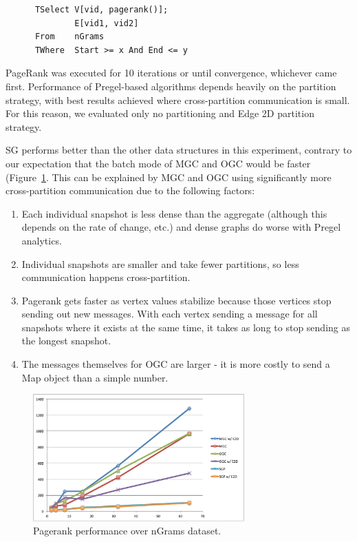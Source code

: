 \begin{small}
\begin{verbatim}
      TSelect V[vid, pagerank()];
              E[vid1, vid2]
      From    nGrams
      TWhere  Start >= x And End <= y
\end{verbatim}
\end{small}

PageRank was executed for 10 iterations or until convergence,
whichever came first.  Performance of Pregel-based algorithms depends
heavily on the partition strategy, with best results achieved where
cross-partition communication is small.  For this reason, we evaluated
only no partitioning and Edge 2D partition strategy.

SG performs better than the other data structures in this experiment,
contrary to our expectation that the batch mode of MGC and OGC would
be faster (Figure~\ref{fig:pagerank}.  This can be explained by MGC
and OGC using significantly more cross-partition communication due to
the following factors:

\begin{enumerate}[leftmargin=*]
\item Each individual snapshot is less dense than the aggregate
  (although this depends on the rate of change, etc.) and dense graphs
  do worse with Pregel analytics.
\item Individual snapshots are smaller and take fewer partitions, so
  less communication happens cross-partition.
\item Pagerank gets faster as vertex values stabilize because those
  vertices stop sending out new messages. With each vertex sending a
  message for all snapshots where it exists at the same time, it takes
  as long to stop sending as the longest snapshot.  
\item The messages themselves for OGC are larger - it is more costly
  to send a Map object than a simple number.
\end{enumerate}

\begin{figure}[t]
\includegraphics[width=3.2in]{figs/pagerank.pdf}
\caption{Pagerank performance over nGrams dataset.}
\label{fig:pagerank}
\end{figure}

